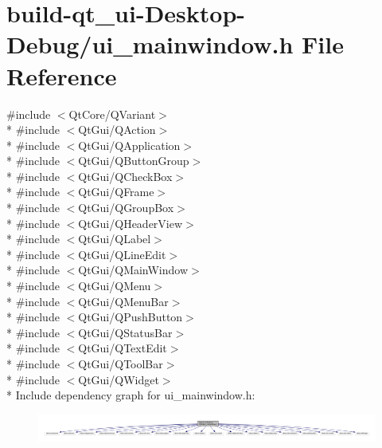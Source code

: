 \hypertarget{qt__ui-_desktop-_debug_2ui__mainwindow_8h}{}\section{build-\/qt\+\_\+ui-\/\+Desktop-\/\+Debug/ui\+\_\+mainwindow.h File Reference}
\label{qt__ui-_desktop-_debug_2ui__mainwindow_8h}
{\ttfamily \#include $<$Qt\+Core/\+Q\+Variant$>$}\\*
{\ttfamily \#include $<$Qt\+Gui/\+Q\+Action$>$}\\*
{\ttfamily \#include $<$Qt\+Gui/\+Q\+Application$>$}\\*
{\ttfamily \#include $<$Qt\+Gui/\+Q\+Button\+Group$>$}\\*
{\ttfamily \#include $<$Qt\+Gui/\+Q\+Check\+Box$>$}\\*
{\ttfamily \#include $<$Qt\+Gui/\+Q\+Frame$>$}\\*
{\ttfamily \#include $<$Qt\+Gui/\+Q\+Group\+Box$>$}\\*
{\ttfamily \#include $<$Qt\+Gui/\+Q\+Header\+View$>$}\\*
{\ttfamily \#include $<$Qt\+Gui/\+Q\+Label$>$}\\*
{\ttfamily \#include $<$Qt\+Gui/\+Q\+Line\+Edit$>$}\\*
{\ttfamily \#include $<$Qt\+Gui/\+Q\+Main\+Window$>$}\\*
{\ttfamily \#include $<$Qt\+Gui/\+Q\+Menu$>$}\\*
{\ttfamily \#include $<$Qt\+Gui/\+Q\+Menu\+Bar$>$}\\*
{\ttfamily \#include $<$Qt\+Gui/\+Q\+Push\+Button$>$}\\*
{\ttfamily \#include $<$Qt\+Gui/\+Q\+Status\+Bar$>$}\\*
{\ttfamily \#include $<$Qt\+Gui/\+Q\+Text\+Edit$>$}\\*
{\ttfamily \#include $<$Qt\+Gui/\+Q\+Tool\+Bar$>$}\\*
{\ttfamily \#include $<$Qt\+Gui/\+Q\+Widget$>$}\\*
Include dependency graph for ui\+\_\+mainwindow.\+h\+:
\nopagebreak
\begin{figure}[H]
\begin{center}
\leavevmode
\includegraphics[width=350pt]{qt__ui-_desktop-_debug_2ui__mainwindow_8h__incl}
\end{center}
\end{figure}
